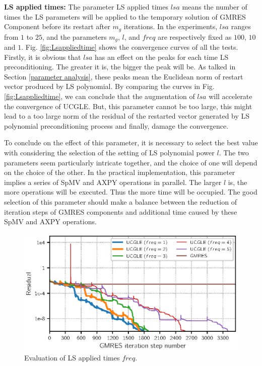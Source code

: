 \textbf{LS applied times: }The parameter LS applied times $lsa$ means the number of times the LS parameters will be applied to the temporary solution of GMRES Component before its restart after $m_g$ iterations. In the experiments, $lsa$ ranges from $1$ to $25$, and the parameters $m_g$, $l$, and $freq$ are respectively fixed as $100$, $10$ and $1$. Fig. \ref{fig:Lsappliedtime} shows the convergence curves of all the tests. Firstly, it is obvious that $lsa$ has an effect on the peaks for each time LS preconditioning. The greater it is, the bigger the peak will be. As talked in Section \ref{parameter analysis}, these peaks mean the Euclidean norm of restart vector produced by LS polynomial. By comparing the curves in Fig. \ref{fig:Lsappliedtime}, we can conclude that the augmentation of $lsa$ will accelerate the convergence of UCGLE. But, this parameter cannot be too large, this might lead to a too large norm of the residual of the restarted vector generated by LS polynomial preconditioning process and finally, damage the convergence.

To conclude on the effect of this parameter, it is necessary to select the best value with considering the selection of the setting of LS polynomial power $l$. The two parameters seem particularly intricate together, and the choice of one will depend on the choice of the other. In the practical implementation, this parameter implies a series of SpMV and AXPY operations in parallel. The larger $l$ is, the more operations will be executed. Thus the more time will be occupied. The good selection of this parameter should make a balance between the reduction of iteration steps of GMRES components and additional time caused by these SpMV and AXPY operations.

\begin{figure}[htbp]
	\centering
	\includegraphics[width=6.2in]{fig/conv_lsfreq.eps}
	\caption{Evaluation of LS applied times $freq$.}
	\label{fig:Lsfreq}
\end{figure}

